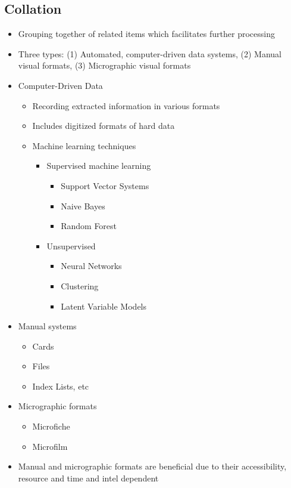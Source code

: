 \documentclass[11pt]{article}
\begin{document}
\subsection{Collation}
\label{sec:org932b1cd}
\begin{itemize}
\item Grouping together of related items which facilitates further processing
\item Three types: (1) Automated, computer-driven data systems, (2) Manual visual formats, (3) Micrographic visual formats
\item Computer-Driven Data
\begin{itemize}
\item Recording extracted information in various formats
\item Includes digitized formats of hard data
\item Machine learning techniques
\begin{itemize}
\item Supervised machine learning
\begin{itemize}
\item Support Vector Systems
\item Naive Bayes
\item Random Forest
\end{itemize}
\item Unsupervised
\begin{itemize}
\item Neural Networks
\item Clustering
\item Latent Variable Models
\end{itemize}
\end{itemize}
\end{itemize}
\item Manual systems
\begin{itemize}
\item Cards
\item Files
\item Index Lists, etc
\end{itemize}
\item Micrographic formats
\begin{itemize}
\item Microfiche
\item Microfilm
\end{itemize}
\item Manual and micrographic formats are beneficial due to their accessibility, resource and time and intel dependent
\end{itemize}
\end{document}
